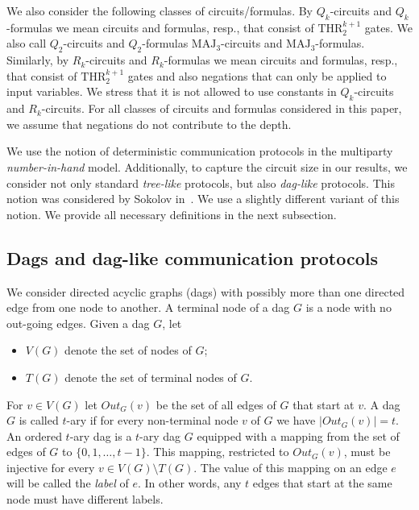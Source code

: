 \documentclass{toc}
\def\MAJ{\mathrm{MAJ}}
\def\THR{\mathrm{THR}}
\begin{document}
We also consider the following classes of circuits/formulas.
By $Q_k$-circuits %
and $Q_k$-formulas %
we mean circuits %
and formulas, resp.,  %
that consist of $\THR^{k + 1}_2$ gates. We also call $Q_2$-circuits and $Q_2$-formulas $\MAJ_3$-circuits and $\MAJ_3$-formulas.  Similarly, by $R_k$-circuits %
and $R_k$-formulas   %
we mean circuits %
and formulas, resp.,   %
%
that consist of $\THR^{k + 1}_2$ gates and also negations that can only be applied to input variables. We stress that it is not allowed to use constants in $Q_k$-circuits and $R_k$-circuits. For all classes of circuits and formulas considered in this paper, we assume that negations do not contribute to the depth.



We use the notion of deterministic communication protocols in the multiparty \emph{number-in-hand} model. Additionally, to capture the circuit size in our results, we consider not only standard \emph{tree-like} protocols, but also \emph{dag-like} protocols. This notion was considered by Sokolov in~\cite{Sok2017}. We use a  slightly different variant of this notion. We provide all necessary definitions in the next subsection.


\subsection{Dags and dag-like communication protocols}

We consider directed acyclic graphs (dags) with possibly more than one directed edge from one node to another.
%
%
%
%
A terminal node of a dag $G$ is a node with no out-going edges.
Given a dag $G$, let
\begin{itemize}
\item $V(G)$ denote the set of nodes of $G$;
\item $T(G)$ denote the  set of terminal nodes of $G$. 
\end{itemize}
For $v\in V(G)$ let $Out_G(v)$ be the set of all edges of $G$ that start at $v$.
A dag $G$ is called $t$-ary if for every non-terminal node $v$ of $G$ we have $|Out_G(v)| = t$. An ordered $t$-ary dag is a $t$-ary dag $G$ equipped with a mapping from the set of edges of $G$ to $\{0, 1, \ldots, t - 1\}$. This mapping, restricted to $Out_G(v)$, must be injective for every $v\in V(G)\setminus T(G)$. The value of this mapping on an edge $e$ will be called the \emph{label} of $e$. In other words, any $t$ edges that start at the same node must have different labels.
\end{document}
